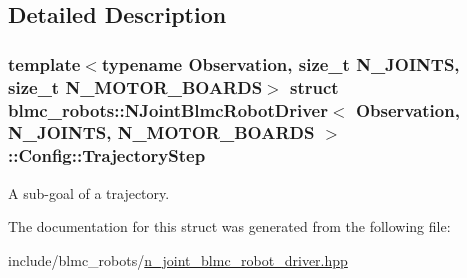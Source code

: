 \subsection{Detailed Description}
\subsubsection*{template$<$typename Observation, size\+\_\+t N\+\_\+\+J\+O\+I\+N\+TS, size\+\_\+t N\+\_\+\+M\+O\+T\+O\+R\+\_\+\+B\+O\+A\+R\+DS$>$\newline
struct blmc\+\_\+robots\+::\+N\+Joint\+Blmc\+Robot\+Driver$<$ Observation, N\+\_\+\+J\+O\+I\+N\+T\+S, N\+\_\+\+M\+O\+T\+O\+R\+\_\+\+B\+O\+A\+R\+D\+S $>$\+::\+Config\+::\+Trajectory\+Step}

A sub-\/goal of a trajectory. 

The documentation for this struct was generated from the following file\+:\begin{DoxyCompactItemize}
\item 
include/blmc\+\_\+robots/\hyperlink{n__joint__blmc__robot__driver_8hpp}{n\+\_\+joint\+\_\+blmc\+\_\+robot\+\_\+driver.\+hpp}\end{DoxyCompactItemize}
